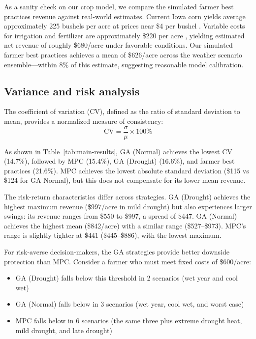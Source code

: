 \documentclass[preprint,12pt]{elsarticle}
\begin{document}
As a sanity check on our crop model, we compare the simulated farmer best practices revenue against real-world estimates. Current Iowa corn yields average approximately 225 bushels per acre \cite{robinson2025usda_crop_report_2025} at prices near \$4 per bushel \cite{usda2026iowa_daily_cash_grain_bids}. Variable costs for irrigation and fertilizer are approximately \$220 per acre \cite{swanson2025high_production_cost_series3}, yielding estimated net revenue of roughly \$680/acre under favorable conditions. Our simulated farmer best practices achieves a mean of \$626/acre across the weather scenario ensemble---within 8\% of this estimate, suggesting reasonable model calibration.


\subsection{Variance and risk analysis}\label{subsec:risk}

The coefficient of variation (CV), defined as the ratio of standard deviation to mean, provides a normalized measure of consistency:
\begin{equation}
\text{CV} = \frac{\sigma}{\mu} \times 100\%
\label{eqn:cv}
\end{equation}

As shown in Table~\ref{tab:main-results}, GA (Normal) achieves the lowest CV (14.7\%), followed by MPC (15.4\%), GA (Drought) (16.6\%), and farmer best practices (21.6\%). MPC achieves the lowest absolute standard deviation (\$115 vs \$124 for GA Normal), but this does not compensate for its lower mean revenue.

The risk-return characteristics differ across strategies. GA (Drought) achieves the highest maximum revenue (\$997/acre in mild drought) but also experiences larger swings: its revenue ranges from \$550 to \$997, a spread of \$447. GA (Normal) achieves the highest mean (\$842/acre) with a similar range (\$527--\$973). MPC's range is slightly tighter at \$441 (\$445--\$886), with the lowest maximum.

For risk-averse decision-makers, the GA strategies provide better downside protection than MPC. Consider a farmer who must meet fixed costs of \$600/acre:
\begin{itemize}
\item GA (Drought) falls below this threshold in 2 scenarios (wet year and cool wet)
\item GA (Normal) falls below in 3 scenarios (wet year, cool wet, and worst case)
\item MPC falls below in 6 scenarios (the same three plus extreme drought heat, mild drought, and late drought)
\end{itemize}
\end{document}
